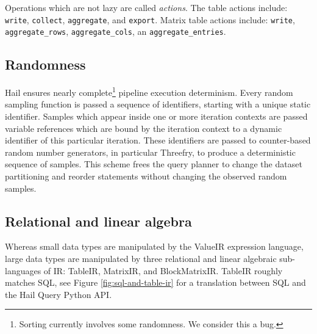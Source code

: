 \documentclass[sigconf, nonacm]{acmart}
\begin{document}
Operations which are not lazy are called \emph{actions}. The table actions include: \texttt{write},
\texttt{collect}, \texttt{aggregate}, and \texttt{export}. Matrix table actions include:
\texttt{write}, \texttt{aggregate\_rows}, \texttt{aggregate\_cols}, an \texttt{aggregate\_entries}.

\subsection{Randomness}

Hail ensures nearly complete\footnote{Sorting currently involves some randomness. We consider this a
bug.} pipeline execution determinism. Every random sampling function is passed a sequence of
identifiers, starting with a unique static identifier. Samples which appear inside one or more
iteration contexts are passed variable references which are bound by the iteration context to a
dynamic identifier of this particular iteration. These identifiers are passed to counter-based
random number generators, in particular Threefry, to produce a deterministic sequence of
samples. This scheme frees the query planner to change the dataset partitioning and reorder
statements without changing the observed random samples.

\subsection{Relational and linear algebra}

Whereas small data types are manipulated by the ValueIR expression language, large data types are
manipulated by three relational and linear algebraic sub-languages of IR: TableIR, MatrixIR, and
BlockMatrixIR. TableIR roughly matches SQL, see Figure \ref{fig:sql-and-table-ir} for a translation
between SQL and the Hail Query Python API.
\end{document}
